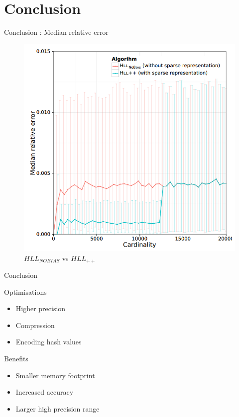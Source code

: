 \documentclass{beamer}
\begin{document}
\section{Conclusion}
\begin{frame}{Conclusion : Median relative error}
  \begin{figure}[c]
    \includegraphics [scale=0.28]  {hll_fig5.png}
    \caption{$HLL_{NOBIAS}$ vs $HLL_{++}$}
  \end{figure}
\end{frame}


\begin{frame}{Conclusion}

  \begin{block}{Optimisations}
    \begin{itemize}
      \item Higher precision
      \item Compression
      \item Encoding hash values
    \end{itemize}
  \end{block}


  \begin{block}{Benefits}
    \begin{itemize}
      \item Smaller memory footprint
      \item Increased accuracy
      \item Larger high precision range 
    \end{itemize}
  \end{block}

\end{frame}
\end{document}
